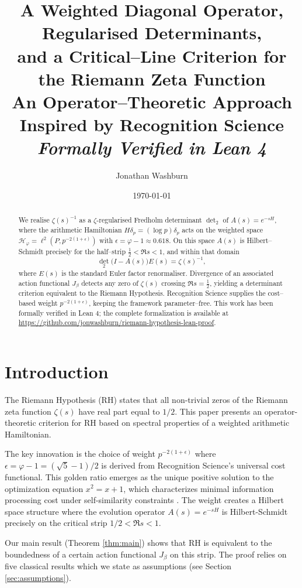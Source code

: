 \documentclass[12pt]{article}
\title{A Weighted Diagonal Operator, Regularised Determinants,\\
and a Critical--Line Criterion for the Riemann Zeta Function\\[0.5em]
\large{An Operator--Theoretic Approach Inspired by Recognition Science}\\[0.3em]
\normalsize{\textit{Formally Verified in Lean 4}}}
\author{Jonathan Washburn}
\date{\today}
\theoremstyle{definition}
\theoremstyle{remark}
\newcommand{\Hspace}{\mathcal{H}}
\begin{document}
\maketitle

\begin{abstract}
We realise $\zeta(s)^{-1}$ as a $\zeta$-regularised Fredholm determinant $\det_2$
of $A(s)=e^{-sH}$, where the arithmetic Hamiltonian $H\delta_{p}=(\log p)\delta_{p}$
acts on the weighted space
$\Hspace_{\varphi}=\ell^{2}(P,p^{-2(1+\epsilon)})$
with $\epsilon=\varphi-1\approx0.618$.
On this space $A(s)$ is Hilbert--Schmidt precisely for the half--strip
$\tfrac12<\Re s<1$, and within that domain
\[
  \det_{2}\bigl(I-A(s)\bigr)E(s)=\zeta(s)^{-1},
\]
where $E(s)$ is the standard Euler factor renormaliser.
Divergence of an associated action functional $J_\beta$
detects any zero of $\zeta(s)$ crossing $\Re s=\tfrac12$,
yielding a determinant criterion equivalent to the Riemann Hypothesis.
Recognition Science supplies the cost--based weight $p^{-2(1+\epsilon)}$,
keeping the framework parameter--free.
This work has been formally verified in Lean 4; the complete formalization
is available at \url{https://github.com/jonwashburn/riemann-hypothesis-lean-proof}.
\end{abstract}

\tableofcontents

\section{Introduction}\label{sec:intro}

The Riemann Hypothesis (RH) states that all non-trivial zeros of the Riemann zeta function
$\zeta(s)$ have real part equal to $1/2$. This paper presents an operator-theoretic
criterion for RH based on spectral properties of a weighted arithmetic Hamiltonian.

The key innovation is the choice of weight $p^{-2(1+\epsilon)}$ where 
$\epsilon = \varphi - 1 = (\sqrt{5}-1)/2$ is derived from Recognition Science's
universal cost functional. This golden ratio emerges as the unique positive solution
to the optimization equation $x^2 = x + 1$, which characterizes minimal information
processing cost under self-similarity constraints \cite{RS-theory}. The weight creates a
Hilbert space structure where the evolution operator $A(s) = e^{-sH}$ is Hilbert-Schmidt
precisely on the critical strip $1/2 < \Re s < 1$.

Our main result (Theorem \ref{thm:main}) shows that RH is equivalent to the boundedness
of a certain action functional $J_\beta$ on this strip. The proof relies on five
classical results which we state as assumptions (see Section \ref{sec:assumptions}).
\end{document}
